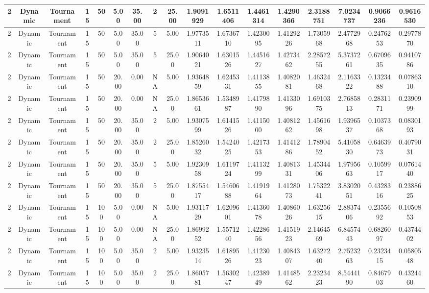 \documentclass[a4paper]{article}
\begin{document}
\begin{center}
\begin{tabular}{ | c | c | c | c | c | c | c | c | c | c | c | c | c | c | c | c | c | }
		\hline
		2	&	Dynamic	&	Tournament	&	15	&	50	&	5.00	&	35.00	&	2	&	25.00	&	1.9091929	&	1.6511406	&	1.4461314	&	1.4290366	&	2.3188751	&	7.0234737	&	0.9066236	&	0.9616530 \\
		\hline
		2	&	Dynamic	&	Tournament	&	15	&	50	&	5.00	&	35.00	&	5	&	5.00	&	1.9773511	&	1.6736710	&	1.4230095	&	1.4129226	&	1.7305968	&	2.4772968	&	0.2476253	&	0.2977870 \\
		\hline
		2	&	Dynamic	&	Tournament	&	15	&	50	&	5.00	&	35.00	&	5	&	25.00	&	1.9064021	&	1.6301526	&	1.4451627	&	1.4273462	&	2.2857255	&	5.3737261	&	0.6709635	&	0.9410786 \\
		\hline
		2	&	Dynamic	&	Tournament	&	15	&	50	&	20.00	&	0.00	&	NA	&	5.00	&	1.9364859	&	1.6245331	&	1.4113855	&	1.4082081	&	1.4632468	&	2.1163322	&	0.1323488	&	0.0786310 \\
		\hline
		2	&	Dynamic	&	Tournament	&	15	&	50	&	20.00	&	0.00	&	NA	&	25.00	&	1.8653661	&	1.5348987	&	1.4179890	&	1.4133096	&	1.6910375	&	2.7685813	&	0.2831171	&	0.2390999 \\
		\hline
		2	&	Dynamic	&	Tournament	&	15	&	50	&	20.00	&	35.00	&	2	&	5.00	&	1.9307599	&	1.6141526	&	1.4115000	&	1.4081262	&	1.4561698	&	1.9396537	&	0.1037368	&	0.0830193 \\
		\hline
		2	&	Dynamic	&	Tournament	&	15	&	50	&	20.00	&	35.00	&	2	&	25.00	&	1.8526032	&	1.5424025	&	1.4217353	&	1.4141286	&	1.7890452	&	5.4105830	&	0.6463973	&	0.4079031 \\
		\hline
		2	&	Dynamic	&	Tournament	&	15	&	50	&	20.00	&	35.00	&	5	&	5.00	&	1.9230958	&	1.6119724	&	1.4113299	&	1.4081331	&	1.4534406	&	1.9795663	&	0.1059917	&	0.0761440 \\
		\hline
		2	&	Dynamic	&	Tournament	&	15	&	50	&	20.00	&	35.00	&	5	&	25.00	&	1.8755417	&	1.5460688	&	1.4191964	&	1.4128073	&	1.7532241	&	3.8302051	&	0.4328316	&	0.2388625 \\
		\hline
		2	&	Dynamic	&	Tournament	&	15	&	100	&	5.00	&	0.00	&	NA	&	5.00	&	1.9311729	&	1.6209601	&	1.4136078	&	1.4086026	&	1.6325615	&	2.8837406	&	0.2355692	&	0.1050853 \\
		\hline
		2	&	Dynamic	&	Tournament	&	15	&	100	&	5.00	&	0.00	&	NA	&	25.00	&	1.8699252	&	1.5571240	&	1.4228656	&	1.4151923	&	2.1464569	&	6.8457443	&	0.6826097	&	0.4374402 \\
		\hline
		2	&	Dynamic	&	Tournament	&	15	&	100	&	5.00	&	35.00	&	2	&	5.00	&	1.9323514	&	1.6189526	&	1.4123023	&	1.4084307	&	1.6327240	&	2.7523263	&	0.2323415	&	0.0580548 \\
		\hline
		2	&	Dynamic	&	Tournament	&	15	&	100	&	5.00	&	35.00	&	2	&	25.00	&	1.8605781	&	1.5630247	&	1.4238949	&	1.4148562	&	2.2323423	&	8.5444190	&	0.8467903	&	0.4324460 \\

\end{tabular}
\end{center}
\end{document}
